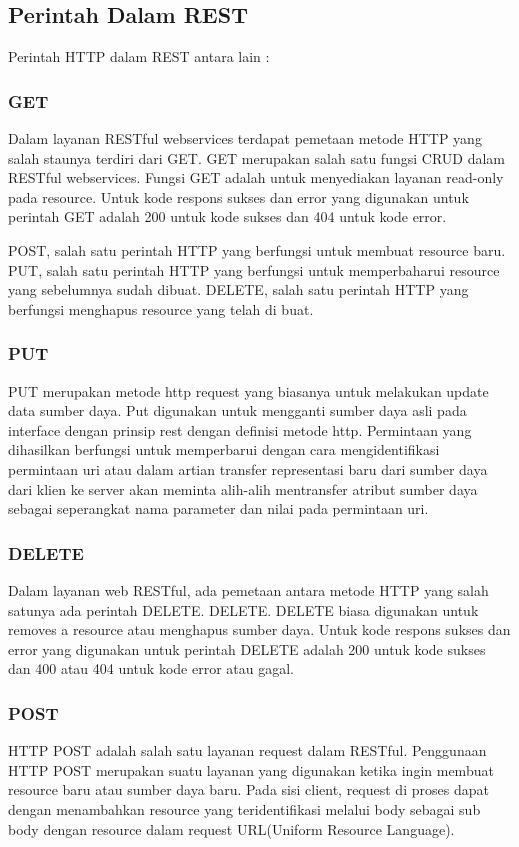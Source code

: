 \subsection{Perintah Dalam REST}
Perintah HTTP dalam REST antara lain :
\subsubsection{GET}
Dalam layanan RESTful webservices terdapat pemetaan metode HTTP yang salah staunya terdiri dari GET. GET merupakan salah satu fungsi CRUD dalam RESTful webservices. Fungsi GET adalah untuk menyediakan layanan read-only pada resource. Untuk kode respons sukses dan error yang digunakan untuk perintah GET adalah 200 untuk kode sukses dan 404 untuk kode error. 

POST, salah satu perintah HTTP yang berfungsi untuk membuat resource baru.
PUT, salah satu perintah HTTP yang berfungsi untuk memperbaharui resource yang sebelumnya sudah dibuat.
DELETE, salah satu perintah HTTP yang berfungsi menghapus resource yang telah di buat.
\subsubsection{PUT}
PUT merupakan metode http request yang biasanya untuk melakukan update data sumber daya. Put digunakan untuk mengganti sumber daya asli pada interface dengan prinsip rest dengan definisi metode http. Permintaan yang dihasilkan berfungsi untuk memperbarui dengan cara  mengidentifikasi permintaan uri atau dalam artian transfer representasi baru dari sumber daya dari klien ke server akan meminta alih-alih mentransfer atribut sumber daya sebagai seperangkat nama parameter dan nilai pada permintaan uri.
\subsubsection{DELETE}
Dalam layanan web RESTful, ada pemetaan antara metode HTTP  yang salah satunya ada perintah DELETE. DELETE. DELETE biasa digunakan untuk removes a resource atau menghapus sumber daya. Untuk kode respons sukses dan error yang digunakan untuk perintah DELETE adalah 200 untuk kode sukses dan 400 atau 404 untuk kode error atau gagal. 
\subsubsection{POST}
HTTP POST adalah salah satu layanan request dalam RESTful. Penggunaan HTTP POST merupakan suatu layanan yang digunakan ketika ingin membuat resource baru atau sumber daya baru. Pada sisi client, request di proses dapat dengan menambahkan resource yang teridentifikasi melalui body sebagai sub body dengan resource dalam request URL(Uniform Resource Language).

